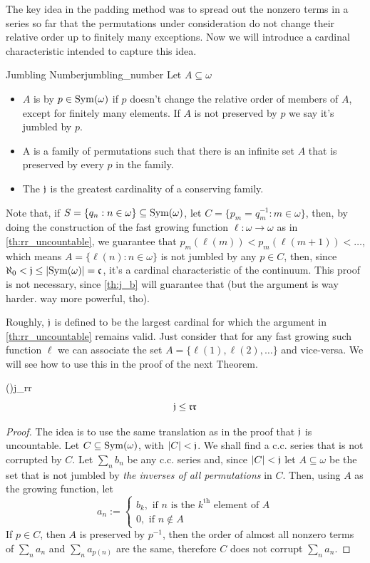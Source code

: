 The key idea in the padding method was to spread out the nonzero terms in a series so far that the permutations under consideration do not change their relative order up to finitely many exceptions. Now we will introduce a cardinal characteristic intended to capture this idea.

\begin{definition}{Jumbling Number}{jumbling_number} Let $A\subseteq\omega$
    \begin{itemize}
        \item $A$ is  by $p\in\mathrm{Sym}(\omega)$ if $p$ doesn't change the relative order of members of $A$, except for finitely many elements. If $A$ is not preserved by $p$ we say it's jumbled by $p$.
        \item A  is a family of permutations such that there is an infinite set $A$ that is preserved by every $p$ in the family.
        \item The  $\mathfrak{j}$ is the greatest cardinality of a conserving family.
    \end{itemize}
\end{definition}
Note that, if $S=\{q_n:n\in\omega\}\subseteq\mathrm{Sym}(\omega)$, let $C=\{p_m=q_m^{-1}:m\in\omega\}$, then, by doing the construction of the fast growing function $\ell:\omega\to\omega$ as in \cref{th:rr_uncountable}, we guarantee that $p_m(\ell(m))<p_m(\ell(m+1))<\dots$, which means $A=\{\ell(n):n\in\omega\}$ is not jumbled by any $p\in C$, then, since $\aleph_0<\mathfrak{j}\leq\lvert\mathrm{Sym}(\omega)\rvert=\mathfrak{c}$, it's a cardinal characteristic of the continuum. This proof is not necessary, since \cref{th:j_b} will guarantee that (but the argument is way harder. way more powerful, tho).

Roughly, $\mathfrak{j}$ is defined to be the largest cardinal for which the argument in \cref{th:rr_uncountable} remains valid. Just consider that for any fast growing such function $\ell$ we can associate the set $A=\{\ell(1),\ell(2),\dots\}$ and vice-versa. We will see how to use this in the proof of the next Theorem.

\begin{lemma}{(\cite{blass})}{j_rr}
    $$\mathfrak{j}\leq\mathfrak{rr}$$
\end{lemma}

\begin{proof}
    The idea is to use the same translation as in the proof that $\mathfrak{j}$ is uncountable. Let $C\subseteq\mathrm{Sym}(\omega)$, with $\lvert C\rvert<\mathfrak{j}$. We shall find a c.c. series that is not corrupted by $C$. Let $\sum_n b_n$ be any c.c. series and, since $\lvert C\rvert<\mathfrak{j}$ let $A\subseteq\omega$ be the set that is not jumbled by \textit{the inverses of all permutations} in $C$. Then, using $A$ as the growing function, let
    $$a_n:=\begin{cases}
        b_k,\text{ if $n$ is the $k^{\text{th}}$ element of $A$}\\
        0,\text{ if $n\notin A$}
    \end{cases}$$
    If $p\in C$, then $A$ is preserved by $p^{-1}$, then the order of almost all nonzero terms of $\sum_n a_n$ and $\sum_n a_{p(n)}$ are the same, therefore $C$ does not corrupt $\sum_n a_n$.
\end{proof}

